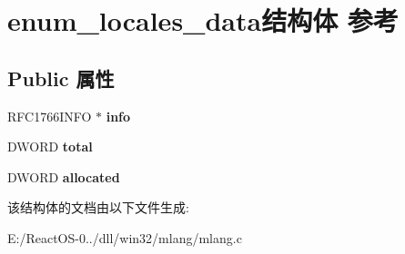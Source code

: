 \hypertarget{structenum__locales__data}{}\section{enum\+\_\+locales\+\_\+data结构体 参考}
\label{structenum__locales__data}
\subsection*{Public 属性}
\begin{DoxyCompactItemize}
\item 
\mbox{\label{structenum__locales__data_a0b9a3447104f9a29675f3b627e33fcaa}} 
R\+F\+C1766\+I\+N\+FO $\ast$ {\bfseries info}
\item 
\mbox{\label{structenum__locales__data_ab32ab59f9e761d2de3f119011f7e05cc}} 
D\+W\+O\+RD {\bfseries total}
\item 
\mbox{\label{structenum__locales__data_aee6bd6335ed6db38411a30f0c407a178}} 
D\+W\+O\+RD {\bfseries allocated}
\end{DoxyCompactItemize}


该结构体的文档由以下文件生成\+:\begin{DoxyCompactItemize}
\item 
E\+:/\+React\+O\+S-\/0../dll/win32/mlang/mlang.\+c\end{DoxyCompactItemize}
